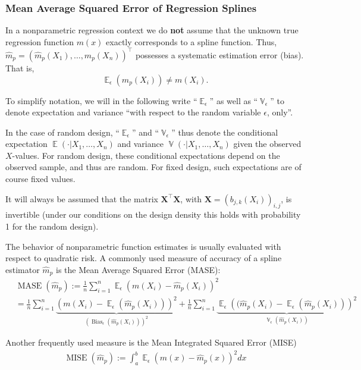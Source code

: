 \documentclass[14pt]{extreport}\usepackage[]{graphicx}\usepackage[]{xcolor}
\DeclareMathOperator{\E}{\mathbb{E}}
\DeclareMathOperator{\V}{\mathbb{V}}
\begin{document}
\subsubsection{Mean Average Squared Error of Regression Splines}

In a nonparametric regression context we do {\bf not} assume that the unknown true regression function $m(x)$ exactly corresponds
to a spline function. Thus, $\hat m_p=(\hat{m}_p(X_1),\dots,\hat{m}_p(X_n))^\top$ possesses a systematic estimation error (bias). That is, 
$$
\E_\epsilon(\hat m_p(X_i))\neq m(X_i).
$$

To simplify notation, we will in the following write ``$\E_\epsilon$'' as well as ``$\V_\epsilon$'' to denote expectation and variance ``with respect to the random variable $\epsilon$, only''. 

\bigskip

In the case of random design,
``$\E_\epsilon$'' and ``$\V_\epsilon$'' thus denote the
conditional
expectation $\E(\cdot|X_1,\dots,X_n)$ and variance $\V(\cdot|X_1,\dots,X_n)$ given the observed $X$-values. For random design,
these conditional expectations depend on the observed sample, and thus are random. For fixed design, such expectations are of course fixed values.

\bigskip

It will always be assumed that the matrix $\mathbf{X}^\top \mathbf{X}$, with $\mathbf{X}=(b_{j,k}(X_i))_{i,j}$, is invertible (under our conditions on the design density this holds with probability 1 for the random design).

\bigskip
The behavior of nonparametric function estimates is usually evaluated with respect to quadratic risk. A commonly used measure of accuracy of a spline estimator $\hat m_p$ is the Mean Average Squared Error (MASE):
\begin{align*}
&\operatorname{MASE}(\hat m_p):=\frac{1}{n}\sum_{i=1}^n \E_\epsilon\left(m(X_i)-\hat{m}_p(X_i)\right)^2\\
& =
\frac{1}{n}\sum_{i=1}^n \underbrace{\left(m(X_i)-\E_\epsilon(\hat{m}_p(X_i))\right)^2}_{(\operatorname{Bias}_\epsilon(\hat{m}_p(X_i)))^2}+\frac{1}{n}\sum_{i=1}^n \underbrace{\E_\epsilon\left((\hat{m}_p(X_i)-\E_\epsilon(\hat{m}_p(X_i))\right)^2}_{\V_\epsilon(\hat{m}_p(X_i))}
\end{align*}

Another frequently used measure is the Mean Integrated Squared Error (MISE)
\begin{align*}
\operatorname{MISE}(\hat m_p):=\int_a^b \E_\epsilon\left(m(x)-\hat m_p(x)\right)^2dx
\end{align*}
\end{document}
